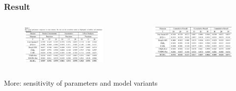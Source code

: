 \documentclass{../presentation}
\begin{document}
    \begin{frame}
        \frametitle{Result}

        \begin{columns}
            \begin{column}{0.5\linewidth}
                \begin{figure}
                    \includegraphics[width=\linewidth]{img/gp01-7.png}
                \end{figure}
            \end{column}
            \begin{column}{0.5\linewidth}
                \begin{figure}
                    \includegraphics[width=\linewidth]{img/gp01-8.png}
                \end{figure}
            \end{column}
        \end{columns}
        \vspace*{0.25cm}
        More: sensitivity of parameters and model variants
    \end{frame}
\end{document}
